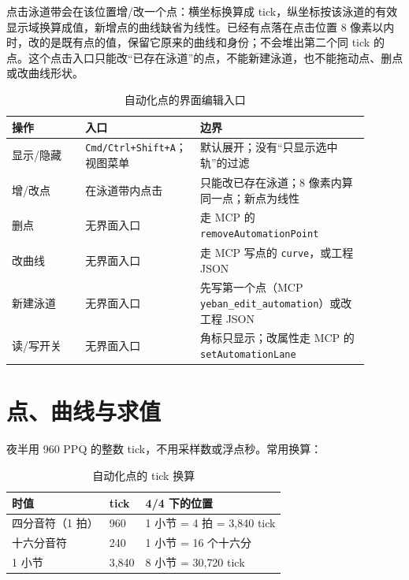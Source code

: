 
点击泳道带会在该位置增/改一个点：横坐标换算成 tick，纵坐标按该泳道的有效显示域换算成值，新增点的曲线缺省为线性。已经有点落在点击位置 8 像素以内时，改的是既有点的值，保留它原来的曲线和身份；不会堆出第二个同 tick 的点。这个点击入口只能改“已存在泳道”的点，不能新建泳道，也不能拖动点、删点或改曲线形状。

\begin{table}[htbp]
\centering
\small
\begin{tabular}{@{}p{0.20\linewidth}p{0.24\linewidth}p{0.46\linewidth}@{}}
\hline
操作 & 入口 & 边界 \\
\hline
显示/隐藏 & \texttt{Cmd/\allowbreak Ctrl+Shift+A}；视图菜单 & 默认展开；没有“只显示选中轨”的过滤 \\
增/改点 & 在泳道带内点击 & 只能改已存在泳道；8 像素内算同一点；新点为线性 \\
删点 & 无界面入口 & 走 MCP 的 \texttt{removeAutomationPoint} \\
改曲线 & 无界面入口 & 走 MCP 写点的 \texttt{curve}，或工程 JSON \\
新建泳道 & 无界面入口 & 先写第一个点（MCP \texttt{yeban\_edit\_automation}）或改工程 JSON \\
读/写开关 & 无界面入口 & 角标只显示；改属性走 MCP 的 \texttt{set\allowbreak Automation\allowbreak Lane} \\
\hline
\end{tabular}
\caption{自动化点的界面编辑入口}
\label{tab:automation-edit-entry}
\end{table}


\section{点、曲线与求值}

夜半用 960 PPQ 的整数 tick，不用采样数或浮点秒。常用换算：

\begin{table}[htbp]
\centering
\small
\begin{tabular}{@{}lll@{}}
\hline
时值 & tick & 4/4 下的位置 \\
\hline
四分音符（1 拍） & 960 & 1 小节 = 4 拍 = 3{,}840 tick \\
十六分音符 & 240 & 1 小节 = 16 个十六分 \\
1 小节 & 3{,}840 & 8 小节 = 30{,}720 tick \\
\hline
\end{tabular}
\caption{自动化点的 tick 换算}
\label{tab:automation-ticks}
\end{table}

